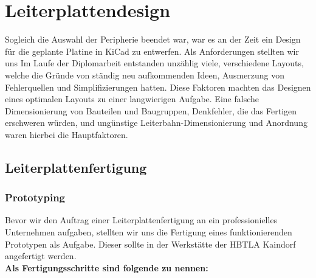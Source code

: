 
\newpage
\section{Leiterplattendesign}

Sogleich die Auswahl der Peripherie beendet war, war es an der Zeit ein Design für die geplante Platine in KiCad zu entwerfen.
Als Anforderungen stellten wir uns
Im Laufe der Diplomarbeit entstanden unzählig viele, verschiedene Layouts, welche die Gründe von ständig neu aufkommenden Ideen, Ausmerzung von Fehlerquellen und Simplifizierungen hatten.
Diese Faktoren machten das Designen eines optimalen Layouts zu einer langwierigen Aufgabe.
Eine falsche Dimensionierung von Bauteilen und Baugruppen, Denkfehler, die das Fertigen erschweren würden, und ungünstige Leiterbahn-Dimensionierung und Anordnung waren hierbei die Hauptfaktoren.

\subsection{Leiterplattenfertigung}

\subsubsection{Prototyping}

Bevor wir den Auftrag einer Leiterplattenfertigung an ein professionielles Unternehmen aufgaben, stellten wir uns die Fertigung eines funktionierenden Prototypen als Aufgabe.
Dieser sollte in der Werkstätte der HBTLA Kaindorf angefertigt werden. \\

\textbf{Als Fertigungsschritte sind folgende zu nennen:}

